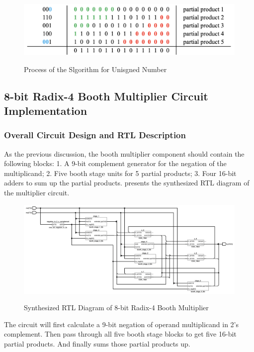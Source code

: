 \begin{figure}[!ht]
	\centering
	\caption{Process of the Slgorithm for Unisgned Number}
	\includegraphics[width=5.7in]{../img/r4b_process_2.png}
	\label{fig:r4b_process_2}
\end{figure}

\subsection{8-bit Radix-4 Booth Multiplier Circuit Implementation}
\subsubsection{Overall Circuit Design and RTL Description}

As the previous discussion, the booth multiplier component should contain the following blocks: 1.
A 9-bit complement generator for the negation of the multiplicand;
2. Five booth stage units for 5 partial products;
3. Four 16-bit adders to sum up the partial products.
 presents the synthesized RTL diagram of the multiplier circuit.

\begin{figure}[!ht]
	\centering
	\caption{Synthesized RTL Diagram of 8-bit Radix-4 Booth Multiplier}
	\includegraphics[width=\textwidth]{../img/overview_booth_rtl.png}
	\label{fig:overview_booth_rtl}
\end{figure}

The circuit will first calculate a 9-bit negation of operand multiplicand in 2's complement.
Then pass through all five booth stage blocks to get five 16-bit partial products.
And finally sums those partial products up.

